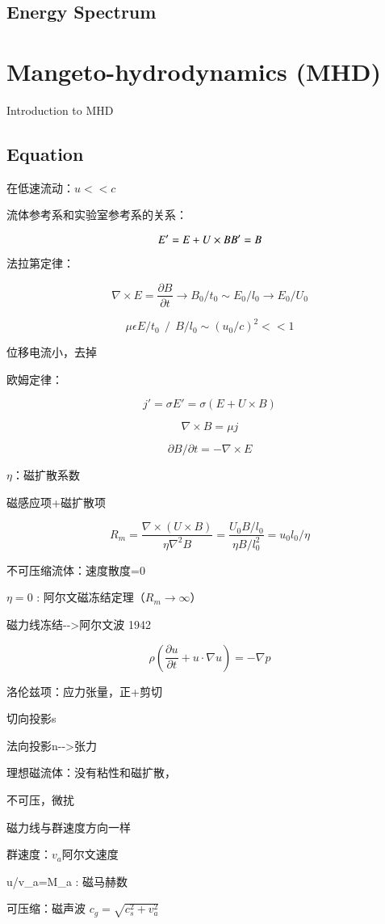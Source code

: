 \documentclass[fontset=windows]{report}
\begin{document}
\section{Energy Spectrum}



\chapter{Mangeto-hydrodynamics (MHD)}

Introduction to MHD

\section{Equation}

在低速流动：\(u<<c\)

流体参考系和实验室参考系的关系：

\[E'=E+U\times B\\
B'=B\]

法拉第定律：

\[\nabla\times E=\frac{\partial B}{\partial t}\rightarrow B_0/t_0\sim E_0/l_0\rightarrow E_0/U_0\]

\[\mu\epsilon E/t_0 \ \  /\ \  B/l_0\sim (u_0/c)^2<<1\]

位移电流小，去掉

欧姆定律：

\[j'=\sigma E'=\sigma(E+U\times B)\]

\[\nabla \times B=\mu j\]

\[\partial B/\partial t=-\nabla\times E\]

\(\eta\)：磁扩散系数

磁感应项+磁扩散项

\[R_m=\frac{\nabla \times (U\times B)}{\eta \nabla^2B}=
\frac{U_0 B/l_0}{\eta B/l_0^2}=u_0l_0/\eta\]

不可压缩流体：速度散度=0

\(\eta=0\) : 阿尔文磁冻结定理（\(R_m\rightarrow \infty\)）

磁力线冻结-\/-\textgreater 阿尔文波 1942

\[\rho(\frac{\partial u}{\partial t}+u\cdot\nabla u)=-\nabla p\]

洛伦兹项：应力张量，正+剪切

切向投影s

法向投影n-\/-\textgreater 张力

理想磁流体：没有粘性和磁扩散，

不可压，微扰

磁力线与群速度方向一样

群速度：\(v_a\)阿尔文速度

u/v\_a=M\_a : 磁马赫数

可压缩：磁声波 \(c_g=\sqrt{c_s^2+v_a^2}\)
\end{document}
